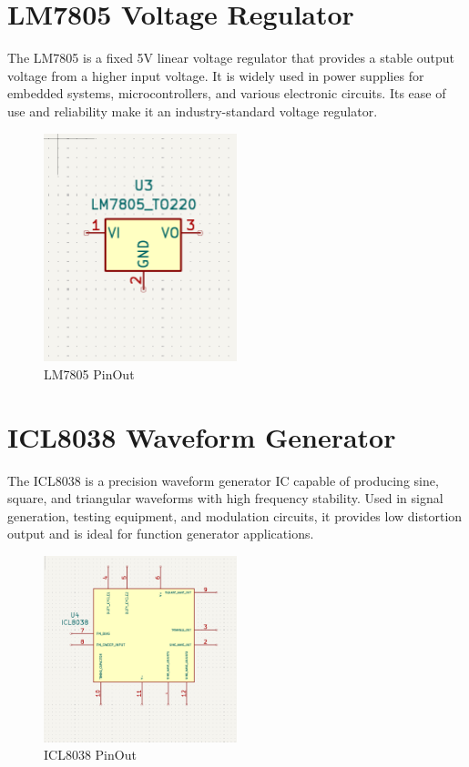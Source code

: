 \documentclass{article}
\begin{document}
\section{LM7805 Voltage Regulator}
The LM7805 is a fixed 5V linear voltage regulator that provides a stable output voltage from a higher input voltage. It is widely used in power supplies for embedded systems, microcontrollers, and various electronic circuits. Its ease of use and reliability make it an industry-standard voltage regulator.
\begin{figure}[H]
    \centering
    \includegraphics[width=0.5\textwidth]{img/LM7805.png}
    \caption{LM7805 PinOut}
    \label{fig:LM7805}
\end{figure}

\section{ICL8038 Waveform Generator}
The ICL8038 is a precision waveform generator IC capable of producing sine, square, and triangular waveforms with high frequency stability. Used in signal generation, testing equipment, and modulation circuits, it provides low distortion output and is ideal for function generator applications.
\begin{figure}[H]
    \centering
    \includegraphics[width=0.5\textwidth]{img/ICL8038.png}
    \caption{ICL8038 PinOut}
    \label{fig:ICL8038}
\end{figure}
\end{document}

